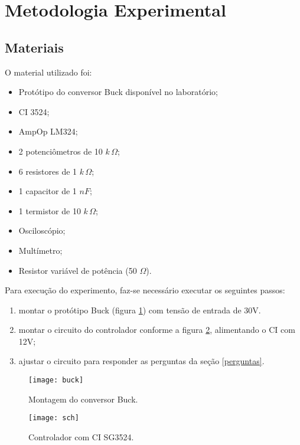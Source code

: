 \newpage
\section{Metodologia Experimental}

\subsection{Materiais}
O material utilizado foi:

\begin{itemize}
	\item Protótipo do conversor Buck disponível no laboratório;
	\item CI 3524;
	\item AmpOp LM324;
	\item 2 potenciômetros de 10 $k \, \Omega$;
    \item 6 resistores de 1 $k \, \Omega$;
    \item 1 capacitor de 1 $nF$;
    \item 1 termistor de 10 $k \, \Omega$;
	\item Osciloscópio;
	\item Multímetro;
	\item Resistor variável de potência (50 $\Omega$).
\end{itemize}

Para execução do experimento, faz-se necessário executar os seguintes passos:

\begin{enumerate}
    \item montar o protótipo Buck (figura \ref{fig:buck}) com tensão de entrada de 30V.
	\item montar o circuito do controlador conforme a figura \ref{fig:sch}, alimentando o CI com 12V;
	\item ajustar o circuito para responder as perguntas da seção \ref{perguntas}.
\end{enumerate}

\begin{figure}[H]
    \centering
    \caption{Montagem do conversor Buck.}
    \texttt{[image: buck]}
    \label{fig:buck}
\end{figure}

\begin{figure}[H]
	\centering
	\caption{Controlador com CI SG3524.}
	\texttt{[image: sch]}
	\label{fig:sch}
\end{figure}



